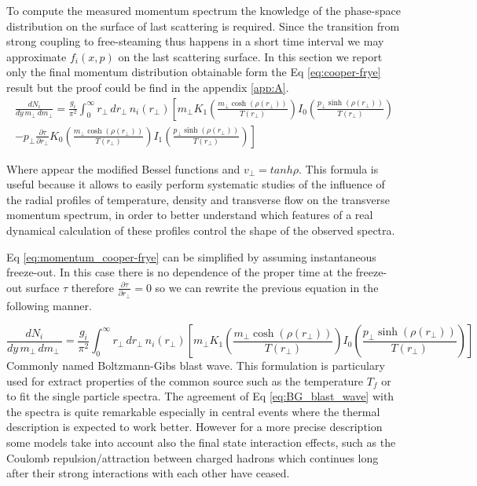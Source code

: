 \documentclass[12pt,a4paper]{book}
\begin{document}
	To compute the measured momentum spectrum the knowledge of the phase-space distribution on the surface of last scattering is required. Since the transition from strong coupling to free-steaming thus happens in a short time interval we may approximate $f_i(x, p)$ on the last scattering surface. In this section we report only the final momentum distribution obtainable form the Eq \ref{eq:cooper-frye} result but the proof could be find in the appendix \ref{app:A}.
	\begin{equation}
		\begin{aligned}
			\frac{dN_i}{dy \, m_\perp \, dm_\perp} = \frac{g_i}{\pi^2} \int_{0}^{\infty} r_\perp \, dr_\perp \, n_i(r_\perp) \left[ 
			m_\perp K_1 \left( \frac{m_\perp \cosh(\rho(r_\perp))}{T(r_\perp)}\right) I_0 \left( \frac{p_\perp \sinh(\rho(r_\perp))}{T(r_\perp)} \right) \right. \\
			\left. - p_\perp \frac{\partial \tau}{\partial r_\perp} K_0 \left( \frac{m_\perp \cosh(\rho(r_\perp))}{T(r_\perp)}\right) I_1 \left( \frac{p_\perp \sinh(\rho(r_\perp))}{T(r_\perp)} \right) \right]
		\end{aligned}
		\label{eq:momentum_cooper-frye}
	\end{equation}
	
	Where appear the modified Bessel functions and $v_\perp= tanh \rho$. This formula is useful because it allows to easily perform systematic studies of the influence of the radial profiles of temperature, density and transverse flow on the transverse momentum spectrum, in order to better understand which features of a real dynamical calculation of these profiles control the shape of the observed spectra.
	
	Eq \ref{eq:momentum_cooper-frye} can be simplified by assuming instantaneous freeze-out. In this case there is no dependence of the proper time at the freeze-out surface $\tau$ therefore $\frac{\partial \tau}{\partial r_\perp}=0$ so we can rewrite the previous equation in the following manner.
	
	\begin{equation}
		\frac{dN_i}{dy \, m_\perp \, dm_\perp \,} = \frac{g_i}{\pi^2} \int_{0}^{\infty} r_\perp \, dr_\perp \, n_i(r_\perp) \left[ m_\perp K_1 \left( \frac{m_\perp \cosh(\rho(r_\perp))}{T(r_\perp)}\right) I_0 \left( \frac{p_\perp \sinh(\rho(r_\perp))}{T(r_\perp)} \right) \right]
		\label{eq:BG_blast_wave}
	\end{equation}
	Commonly named Boltzmann-Gibs blast wave. This formulation is particulary used for extract properties of the common source such as the temperature $T_f$ or to fit the single particle spectra. The agreement of Eq \ref{eq:BG_blast_wave} with the spectra is quite remarkable especially in central events where the thermal description is expected to work better. However for a more precise description some models take into account also the final state interaction effects, such as the Coulomb repulsion/attraction between charged hadrons which continues long after their strong interactions with each other have ceased.
	
\end{document}
